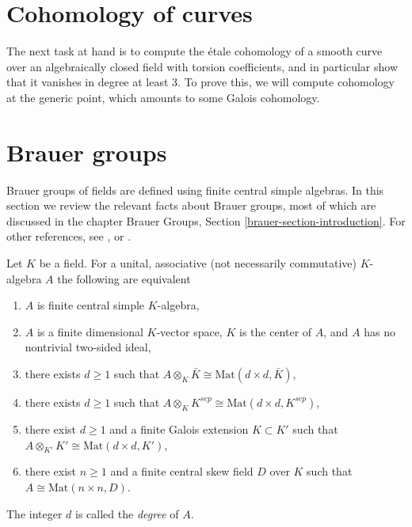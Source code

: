 \section{Cohomology of curves}
\label{section-cohomology-curves}

\noindent
The next task at hand is to compute the \'etale cohomology of a smooth curve
over an algebraically closed field with torsion coefficients, and in
particular show that it vanishes in degree at least 3. To prove this, we
will compute cohomology at the generic point, which
amounts to some Galois cohomology.





\section{Brauer groups}
\label{section-brauer-groups}

\noindent
Brauer groups of fields are defined using finite central simple algebras.
In this section we review the relevant facts about Brauer groups, most of
which are discussed in the chapter
Brauer Groups, Section \ref{brauer-section-introduction}.
For other references, see \cite{SerreCorpsLocaux},
\cite{SerreGaloisCohomology} or \cite{Weil}.

\begin{theorem}
\label{theorem-central-simple-algebra}
Let $K$ be a field. For a unital, associative (not necessarily commutative)
$K$-algebra $A$ the following are equivalent
\begin{enumerate}
\item $A$ is finite central simple $K$-algebra,
\item $A$ is a finite dimensional $K$-vector space, $K$ is the center of $A$,
and $A$ has no nontrivial two-sided ideal,
\item there exists $d \geq 1$ such that
$A \otimes_K \bar K \cong \text{Mat}(d \times d, \bar K)$,
\item there exists $d \geq 1$ such that
$A \otimes_K K^{sep} \cong \text{Mat}(d \times d, K^{sep})$,
\item there exist $d \geq 1$ and a finite Galois extension $K \subset K'$
such that
$A \otimes_{K'} K' \cong \text{Mat}(d \times d, K')$,
\item there exist $n \geq 1$ and a finite central skew field $D$
over $K$ such that $A \cong \text{Mat}(n \times n, D)$.
\end{enumerate}
The integer $d$ is called the {\it degree} of $A$.
\end{theorem}

